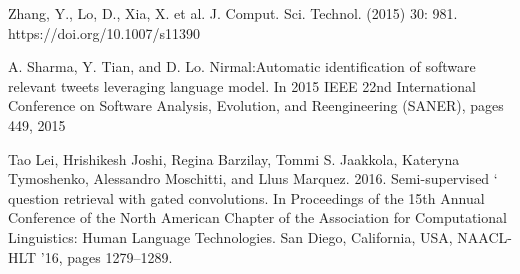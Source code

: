 \begin{thebibliography}{1}
Zhang, Y., Lo, D., Xia, X. et al. J. Comput. Sci. Technol. (2015) 30: 981. https://doi.org/10.1007/s11390

 A. Sharma, Y. Tian, and D. Lo. Nirmal:Automatic identification of software relevant tweets leveraging language model.  In 2015 IEEE 22nd International Conference on Software Analysis, Evolution, and Reengineering (SANER), pages 449, 2015
 
Tao Lei, Hrishikesh Joshi, Regina Barzilay, Tommi S. Jaakkola, Kateryna Tymoshenko, Alessandro Moschitti, and Lluıs Marquez. 2016. Semi-supervised ` question retrieval with gated convolutions. In Proceedings of the 15th Annual Conference of the North American Chapter of the Association for Computational Linguistics: Human Language Technologies. San Diego, California, USA, NAACL-HLT ’16, pages 1279–1289.

\end{thebibliography}
